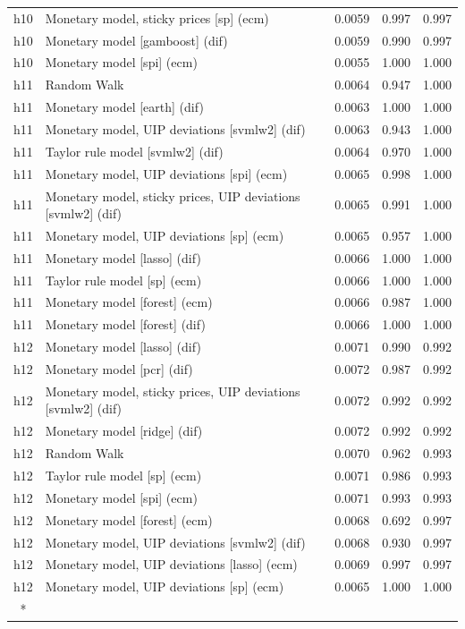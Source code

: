 \begin{ThreePartTable}
\begin{longtable}[t]{cp{5.5cm}ccc}
h10 & \raggedright Monetary model, sticky prices [sp] (ecm) & 0.0059 & 0.997 & 0.997\\
h10 & \raggedright Monetary model [gamboost] (dif) & 0.0059 & 0.990 & 0.997\\
h10 & \raggedright Monetary model [spi] (ecm) & 0.0055 & 1.000 & 1.000\\
\addlinespace
h11 & \raggedright Random Walk & 0.0064 & 0.947 & 1.000\\
h11 & \raggedright Monetary model [earth] (dif) & 0.0063 & 1.000 & 1.000\\
h11 & \raggedright Monetary model, UIP deviations [svmlw2] (dif) & 0.0063 & 0.943 & 1.000\\
h11 & \raggedright Taylor rule model [svmlw2] (dif) & 0.0064 & 0.970 & 1.000\\
h11 & \raggedright Monetary model, UIP deviations [spi] (ecm) & 0.0065 & 0.998 & 1.000\\
h11 & \raggedright Monetary model, sticky prices, UIP deviations [svmlw2] (dif) & 0.0065 & 0.991 & 1.000\\
h11 & \raggedright Monetary model, UIP deviations [sp] (ecm) & 0.0065 & 0.957 & 1.000\\
h11 & \raggedright Monetary model [lasso] (dif) & 0.0066 & 1.000 & 1.000\\
h11 & \raggedright Taylor rule model [sp] (ecm) & 0.0066 & 1.000 & 1.000\\
h11 & \raggedright Monetary model [forest] (ecm) & 0.0066 & 0.987 & 1.000\\
h11 & \raggedright Monetary model [forest] (dif) & 0.0066 & 1.000 & 1.000\\
\addlinespace
h12 & \raggedright Monetary model [lasso] (dif) & 0.0071 & 0.990 & 0.992\\
h12 & \raggedright Monetary model [pcr] (dif) & 0.0072 & 0.987 & 0.992\\
h12 & \raggedright Monetary model, sticky prices, UIP deviations [svmlw2] (dif) & 0.0072 & 0.992 & 0.992\\
h12 & \raggedright Monetary model [ridge] (dif) & 0.0072 & 0.992 & 0.992\\
h12 & \raggedright Random Walk & 0.0070 & 0.962 & 0.993\\
h12 & \raggedright Taylor rule model [sp] (ecm) & 0.0071 & 0.986 & 0.993\\
h12 & \raggedright Monetary model [spi] (ecm) & 0.0071 & 0.993 & 0.993\\
h12 & \raggedright Monetary model [forest] (ecm) & 0.0068 & 0.692 & 0.997\\
h12 & \raggedright Monetary model, UIP deviations [svmlw2] (dif) & 0.0068 & 0.930 & 0.997\\
h12 & \raggedright Monetary model, UIP deviations [lasso] (ecm) & 0.0069 & 0.997 & 0.997\\
h12 & \raggedright Monetary model, UIP deviations [sp] (ecm) & 0.0065 & 1.000 & 1.000\\*
\end{longtable}
\end{ThreePartTable}
\endgroup{}

